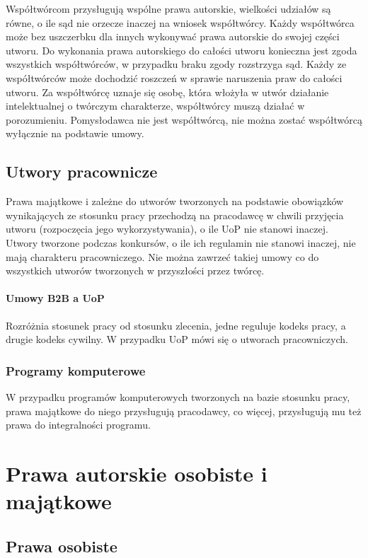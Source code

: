 \documentclass{article}
\begin{document}
Współtwórcom przysługują wspólne prawa autorskie, wielkości udziałów są równe, o ile sąd nie orzecze inaczej na wniosek współtwórcy.
Każdy współtwórca może bez uszczerbku dla innych wykonywać prawa autorskie do swojej części utworu.
Do wykonania prawa autorskiego do całości utworu konieczna jest zgoda wszystkich współtwórców, w przypadku braku zgody rozstrzyga sąd.
Każdy ze współtwórców może dochodzić roszczeń w sprawie naruszenia praw do całości utworu.
Za współtwórcę uznaje się osobę, która włożyła w utwór działanie intelektualnej o twórczym charakterze, współtwórcy muszą działać w porozumieniu.
Pomysłodawca nie jest współtwórcą, nie można zostać współtwórcą wyłącznie na podstawie umowy.

\subsection{Utwory pracownicze}

Prawa majątkowe i zależne do utworów tworzonych na podstawie obowiązków wynikających ze stosunku pracy przechodzą na pracodawcę w chwili przyjęcia utworu (rozpoczęcia jego wykorzystywania), o ile UoP nie stanowi inaczej.
Utwory tworzone podczas konkursów, o ile ich regulamin nie stanowi inaczej, nie mają charakteru pracowniczego.
Nie można zawrzeć takiej umowy co do wszystkich utworów tworzonych w przyszłości przez twórcę.

\paragraph{Umowy B2B a UoP}

Rozróżnia stosunek pracy od stosunku zlecenia, jedne reguluje kodeks pracy, a drugie kodeks cywilny. W przypadku UoP mówi się o utworach pracowniczych.

\subsubsection{Programy komputerowe}

W przypadku programów komputerowych tworzonych na bazie stosunku pracy, prawa majątkowe do niego przysługują pracodawcy, co więcej, przysługują mu też prawa do integralności programu.

\section{Prawa autorskie osobiste i majątkowe}

\subsection{Prawa osobiste}
\end{document}
